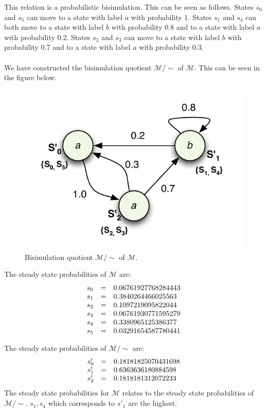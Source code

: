 \documentclass[12pt]{report}
\begin{document}
This relation is a probabilistic bisimulation. This can be seen as follows. States $s_0$ and $s_5$ can move to a state with label $a$ with probability 1. States $s_1$ and $s_4$ can both move to a state with label $b$ with probability 0.8 and to a state with label $a$ with probability 0.2. States $s_2$ and $s_3$ can move to a state with label $b$ with probability 0.7 and to a state with label $a$ with probability 0.3.\\
\\
We have constructed the bisimulation quotient $\mathcal{M} / \sim$ of $\mathcal{M}$. This can be seen in the figure below.
\begin{figure}[H]
	\begin{center}
		\includegraphics[scale=.85]{../GFX/Answer-B2-2b.pdf}
	\end{center}
	\caption{Bisimulation quotient $\mathcal{M} / \sim$ of $\mathcal{M}$.}
	\label{fig:b22b}
\end{figure}

The steady state probabilities of $\mathcal{M}$ are:
$$\begin{array}{l c l}
	s_0 & = & 0.06761927768284443\\
	s_1 & = & 0.3840264466025563\\
	s_2 & = & 0.1097219095822044\\
	s_3 & = & 0.06761930771595279\\
	s_4 & = & 0.3380965125386377\\
	s_5 & = & 0.03291654587780441
\end{array}$$

The steady state probabilities of $\mathcal{M} / \sim$ are:
$$\begin{array}{l c l}
	s'_0 & = & 0.18181825070431698\\
	s'_1 & = & 0.6363636180884598\\
	s'_2 & = & 0.1818181312072233
\end{array}$$
The steady state probabilities for $\mathcal{M}$ relates to the steady state probabilities of $\mathcal{M} / \sim$. $s_1, s_4$ which corresponds to $s'_1$ are the highest.
\end{document}
